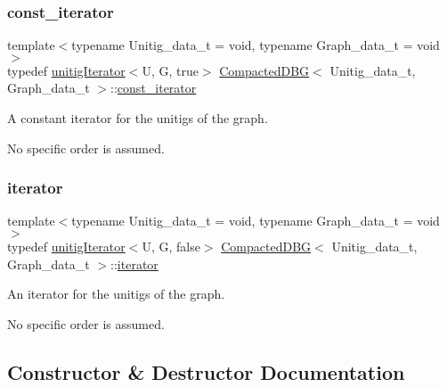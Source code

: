 \subsubsection{\texorpdfstring{const\+\_\+iterator}{const\_iterator}}
{\footnotesize\ttfamily template$<$typename Unitig\+\_\+data\+\_\+t = void, typename Graph\+\_\+data\+\_\+t = void$>$ \\
typedef \hyperlink{classunitigIterator}{unitig\+Iterator}$<$U, G, true$>$ \hyperlink{classCompactedDBG}{Compacted\+D\+BG}$<$ Unitig\+\_\+data\+\_\+t, Graph\+\_\+data\+\_\+t $>$\+::\hyperlink{classCompactedDBG_a7725fc78ad52227df1f70d9b8f44622c}{const\+\_\+iterator}}



A constant iterator for the unitigs of the graph. 

No specific order is assumed. \mbox{\label{classCompactedDBG_af4a6df70628f698d9a2ee843b5359883}} 
\subsubsection{\texorpdfstring{iterator}{iterator}}
{\footnotesize\ttfamily template$<$typename Unitig\+\_\+data\+\_\+t = void, typename Graph\+\_\+data\+\_\+t = void$>$ \\
typedef \hyperlink{classunitigIterator}{unitig\+Iterator}$<$U, G, false$>$ \hyperlink{classCompactedDBG}{Compacted\+D\+BG}$<$ Unitig\+\_\+data\+\_\+t, Graph\+\_\+data\+\_\+t $>$\+::\hyperlink{classCompactedDBG_af4a6df70628f698d9a2ee843b5359883}{iterator}}



An iterator for the unitigs of the graph. 

No specific order is assumed. 

\subsection{Constructor \& Destructor Documentation}
\mbox{\label{classCompactedDBG_ad6584f016b02651312c69ac444349bfe}} 
